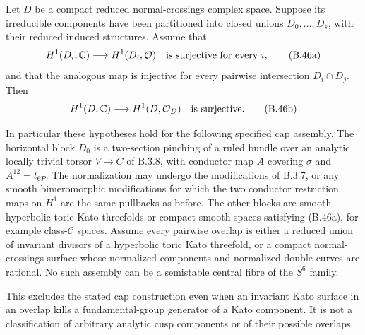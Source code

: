 \begin{proposition}\label{push:src:B.4.6}\label{push:B46}
Let $D$ be a compact reduced normal-crossings complex
space. Suppose its irreducible components have been
partitioned into closed unions $D_0,\ldots,D_s$, with
their reduced induced structures. Assume that
\[
 H^1(D_i,\mathbb C)\longrightarrow H^1(D_i,\mathcal O)
 \quad\hbox{is surjective for every }i,
 \tag{B.46a}
\]
and that the analogous map is injective for every
pairwise intersection $D_i\cap D_j$. Then
\[
 H^1(D,\mathbb C)\longrightarrow H^1(D,\mathcal O_D)
 \quad\hbox{is surjective}.
 \tag{B.46b}
\]

In particular these hypotheses hold for the following
specified cap assembly. The horizontal block $D_0$ is
a two-section pinching of a ruled bundle over an
analytic locally trivial torsor $V\to C$ of B.3.8,
with conductor map $A$ covering $\sigma$ and
$A^{12}=t_{6P}$. The normalization may undergo the
modifications of B.3.7, or any smooth bimeromorphic
modifications for which the two conductor restriction
maps on $H^1$ are the same pullbacks as before.
The other blocks are smooth hyperbolic toric Kato
threefolds or compact smooth spaces satisfying
(B.46a), for example class-$\mathcal C$ spaces.
Assume every pairwise overlap is either a reduced
union of invariant divisors of a hyperbolic toric
Kato threefold, or a compact normal-crossings surface
whose normalized components and normalized double
curves are rational. No such assembly can be a
semistable central fibre of the $S^6$ family.

This excludes the stated cap construction even when
an invariant Kato surface in an overlap kills a
fundamental-group generator of a Kato component.
It is not a classification of arbitrary analytic
cusp components or of their possible overlaps.
\end{proposition}
